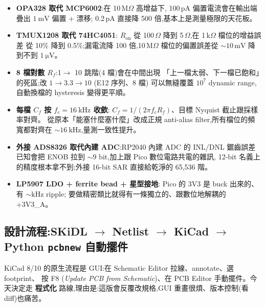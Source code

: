 \begin{itemize}[leftmargin=2em,itemsep=0pt]
  \item \textbf{OPA328 取代 MCP6002}:在 10\,M\(\Omega\) 高增益下,
        100\,pA 偏置電流會在輸出端疊出 \(\SI{1}{\milli\volt}\) 偏置 + 漂移;
        0.2\,pA 直接降 500 倍,基本上是測量極限的天花板。
  \item \textbf{TMUX1208 取代 74HC4051}:
        \(R_\text{on}\) 從 100\,\(\Omega\) 降到 5\,\(\Omega\),在 1\,k\(\Omega\) 檔位的增益誤差
        從 10\% 降到 0.5\%;漏電流降 100 倍,10\,M\(\Omega\) 檔位的偏置誤差從
        \(\sim 10\,\mathrm{mV}\) 降到不到 \(\SI{1}{\micro\volt}\)。
  \item \textbf{8 檔對數 \(R_f\)}:1\(\to\) 10 跳階(4 檔)會在中間出現
        「上一檔太弱、下一檔已飽和」的死區;改 \(1 \to 3.3 \to 10\) (E12 序列、8 檔)
        可以無縫覆蓋 \(10^7\) dynamic range,自動換檔的 hysteresis 變得更平順。
  \item \textbf{每檔 \(C_f\) 按 \(f_c = \SI{16}{\kilo\hertz}\) 收歛}:
        \(C_f = 1 / (2\pi f_c R_f)\)、目標 Nyquist 截止跟採樣率對齊。
        從原本「能塞什麼塞什麼」改成正規 anti-alias filter,所有檔位的頻寬都對齊在
        \(\sim \SI{16}{\kilo\hertz}\),量測一致性提升。
  \item \textbf{外接 ADS8326 取代內建 ADC}:RP2040 內建 ADC 的 INL/DNL 鋸齒誤差
        已知會把 ENOB 拉到 \(\sim 9\) bit,加上跟 Pico 數位電路共電的雜訊,
        12-bit 名義上的精度根本拿不到;外接 16-bit SAR 直接給乾淨的 65,536 階。
  \item \textbf{LP5907 LDO + ferrite bead + 星型接地}:
        Pico 的 3V3 是 buck 出來的、有 \(\sim \mathrm{kHz}\) ripple;
        要做精密類比就得有一條獨立的、跟數位地解耦的 +3V3\_A。
\end{itemize}

\subsection*{設計流程:SKiDL \(\to\) Netlist \(\to\) KiCad \(\to\) Python \texttt{pcbnew} 自動擺件}

KiCad 8/10 的原生流程是 GUI:在 Schematic Editor 拉線、annotate、選 footprint、
按 F8 (\emph{Update PCB from Schematic})、在 PCB Editor 手動擺件。今天決定走 \textbf{程式化}
路線,理由是:這版會反覆改規格,GUI 重畫很煩、版本控制(看 diff)也痛苦。

